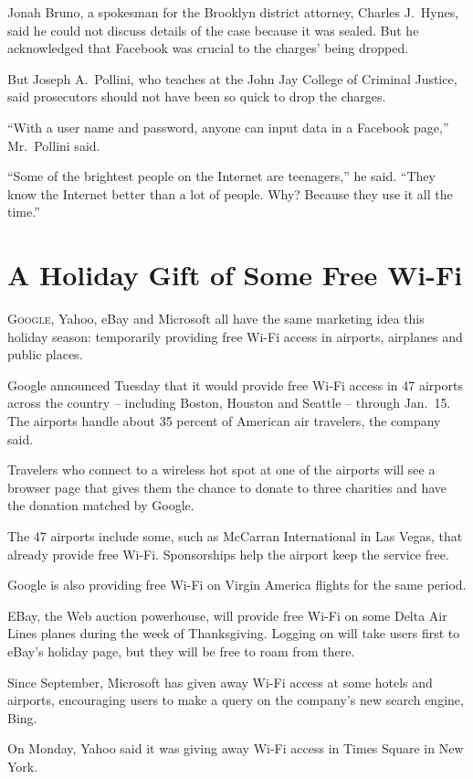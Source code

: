 ﻿\documentclass[12pt]{article}
\begin{document}
Jonah Bruno, a spokesman for the Brooklyn district attorney, Charles J.~Hynes, said he could not
discuss details of the case because it was sealed. But he acknowledged that Facebook was crucial to
the charges' being dropped.

But Joseph A.~Pollini, who teaches at the John Jay College of Criminal Justice, said prosecutors
should not have been so quick to drop the charges.

``With a user name and password, anyone can input data in a Facebook page,'' Mr.~Pollini said.

``Some of the brightest people on the Internet are teenagers,'' he said. ``They know the Internet
better than a lot of people. Why? Because they use it all the time.''

\section{A Holiday Gift of Some Free Wi-Fi}

\lettrine{G}{oogle}, Yahoo, eBay and Microsoft all have the same marketing
idea this holiday season: temporarily providing free Wi-Fi access in airports, airplanes and public
places.

Google announced Tuesday that it would provide free Wi-Fi access in 47 airports across the country
-- including Boston, Houston and Seattle -- through Jan.~15. The airports handle about 35 percent of
American air travelers, the company said.

Travelers who connect to a wireless hot spot at one of the airports will see a browser page that
gives them the chance to donate to three charities and have the donation matched by Google.

The 47 airports include some, such as McCarran International in Las Vegas, that already provide free
Wi-Fi. Sponsorships help the airport keep the service free.

Google is also providing free Wi-Fi on Virgin America flights for the same period.

EBay, the Web auction powerhouse, will provide free Wi-Fi on some Delta Air Lines planes during the
week of Thanksgiving. Logging on will take users first to eBay's holiday page, but they will be free
to roam from there.

Since September, Microsoft has given away Wi-Fi access at some hotels and airports, encouraging
users to make a query on the company's new search engine, Bing.

On Monday, Yahoo said it was giving away Wi-Fi access in Times Square in New York.
\end{document}
